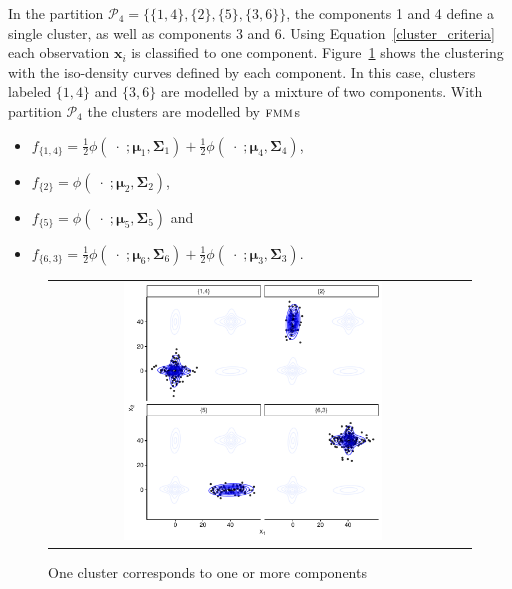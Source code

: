 \documentclass[submit]{smj}
\theoremstyle{definition}
\newcommand{\m}[1]{\boldsymbol{#1}}
\newcommand{\fmm}{\textsc{fmm}\xspace}
\begin{document}
In the partition $\mathcal{P}_4 = \{ \{1, 4\},\{2\}, \{5\}, \{3, 6\} \}$, the components 1 and 4 define a single cluster, as well as components 3 and 6. Using Equation~\ref{cluster_criteria} each observation $\m x_i$ is classified to one component. Figure~\ref{ex_two_one} shows the clustering with the iso-density curves defined by each component. In this case, clusters labeled $\{1,4\}$ and $\{3, 6\}$ are modelled by a mixture of two components. With partition $\mathcal{P}_4$ the clusters are modelled by $\fmm$s
\begin{itemize}
\item $f_{\{1,4\}} = \frac{1}{2} \phi(\;\cdot\; ;  \m\mu_1, \m\Sigma_1) + \frac{1}{2} \phi(\;\cdot\; ;  \m\mu_4, \m\Sigma_4)$, 
\item $f_{\{2\}} = \phi(\;\cdot\; ;  \m\mu_2, \m\Sigma_2)$, 
\item $f_{\{5\}} = \phi(\;\cdot\; ;  \m\mu_5, \m\Sigma_5)$ and
\item $f_{\{6,3\}} = \frac{1}{2} \phi(\;\cdot\; ;  \m\mu_6, \m\Sigma_6) + \frac{1}{2} \phi(\;\cdot\; ;  \m\mu_3, \m\Sigma_3)$.
\end{itemize}

\begin{figure}[h]
\begin{center}
\begin{tabular}{cc}
  \includegraphics[width=0.65\textwidth]{figures/partition-example-part4.pdf} \\
 \end{tabular}
 \caption{One cluster corresponds to one or more components}\label{ex_two_one}
\end{center}
\end{figure}
\end{document}
